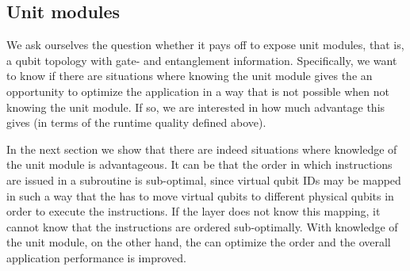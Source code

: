\subsection{Unit modules}
\label{sec:evaluation-unit-modules}
We ask ourselves the question whether it pays off to expose unit modules, that is, a qubit topology with gate- and entanglement information.
Specifically, we want to know if there are situations where knowing the unit module gives the \host an opportunity to optimize the application in a way that is not possible when not knowing the unit module.
If so, we are interested in how much advantage this gives (in terms of the runtime quality defined above).

In the next section we show that there are indeed situations where knowledge of the unit module is advantageous.
It can be that the order in which \netqasm instructions are issued in a subroutine is sub-optimal, since virtual qubit IDs may be mapped in such a way that the \QNPU has to move virtual qubits to different physical qubits in order to execute the instructions.
If the \host layer does not know this mapping, it cannot know that the instructions are ordered sub-optimally.
With knowledge of the unit module, on the other hand, the \host can optimize the order and the overall application performance is improved.

